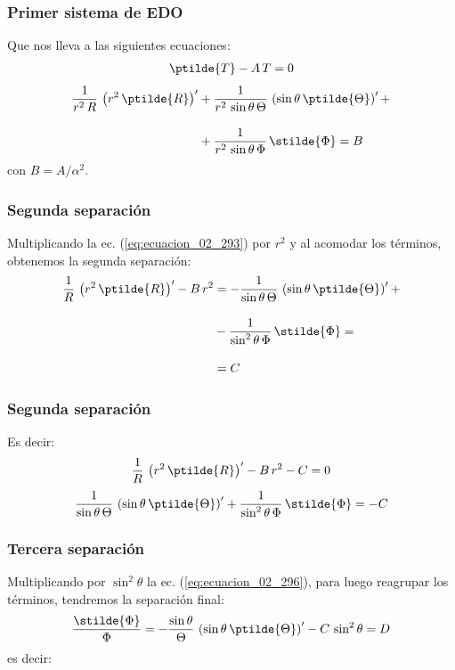 \begin{frame}
\frametitle{Primer sistema de EDO}
Que nos lleva a las siguientes ecuaciones:
\begin{align}
\ptilde{T} - A \, T = 0
\label{eq:ecuacion_02_292}
\end{align}
\begin{align}
\begin{aligned}
\dfrac{1}{r^{2} \, R} \, \left( r^{2} \, \ptilde{R} \right)^{\prime} &+ \dfrac{1}{r^{2} \, \sin \theta \, \Theta} \, \left( \sin \theta \, \ptilde{\Theta} \right)^{\prime} + \\[1em]
&+ \dfrac{1}{r^{2} \, \sin \theta \, \Phi} \, \stilde{\Phi} = B
\end{aligned}
\label{eq:ecuacion_02_293}
\end{align}
con $B = A / \alpha^{2}$.
\end{frame}
\begin{frame}
\frametitle{Segunda separación}
Multiplicando la ec. (\ref{eq:ecuacion_02_293}) por $r^{2}$ y al acomodar los términos, obtenemos la segunda separación:
\begin{align}
\begin{aligned}
\dfrac{1}{R} \, \left( r^{2} \, \ptilde{R} \right)^{\prime} - B \, r^{2} &=  - \dfrac{1}{\sin \theta \, \Theta} \, \left( \sin \theta \, \ptilde{\Theta} \right)^{\prime} + \\[1em]
&- \dfrac{1}{\sin^{2} \theta \, \Phi} \, \stilde{\Phi} = \\[1em]
&= C
\end{aligned}
\label{eq:ecuacion_02_294}
\end{align}
\end{frame}
\begin{frame}
\frametitle{Segunda separación}
Es decir:
\begin{align}
\dfrac{1}{R} \, \left( r^{2} \, \ptilde{R} \right)^{\prime} - B \, r^{2} - C = 0
\label{eq:ecuacion_02_295}
\end{align}
\begin{align}
\dfrac{1}{\sin \theta \, \Theta} \, \left( \sin \theta \, \ptilde{\Theta} \right)^{\prime} + \dfrac{1}{\sin^{2} \theta \, \Phi} \, \stilde{\Phi} = - C
\label{eq:ecuacion_02_296}
\end{align}
\end{frame}
\begin{frame}
\frametitle{Tercera separación}
Multiplicando por $\sin^{2} \theta$ la ec. (\ref{eq:ecuacion_02_296}), para luego reagrupar los términos, tendremos la separación final:
\begin{align}
\dfrac{\stilde{\Phi}}{\Phi} = - \dfrac{\sin \theta}{\Theta} \, \left( \sin \theta \, \ptilde{\Theta} \right)^{\prime} - C \, \sin^{2} \theta = D
\label{eq:ecuacion_02_297}
\end{align}
es decir:
\end{frame}

